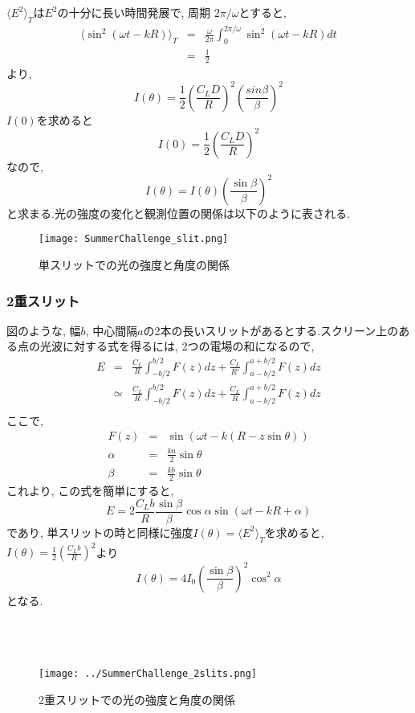 $\langle E^2\rangle_T$は$E^2$の十分に長い時間発展で, 周期 $2\pi / \omega$とすると, 
\begin{eqnarray*}
  \langle \sin^2(\omega t - kR)\rangle_T  &=& \frac{\omega}{2\pi} \int_{0}^{2\pi / \omega} \sin^2(\omega t - kR) dt \\
  &=& \frac{1}{2}
\end{eqnarray*}
より, 
\[
  I(\theta) = \frac{1}{2} \left(\frac{C_L D}{R}\right)^2 \left(\frac{sin \beta}{\beta}\right)^2
\]
$I(0)$を求めると
\[
  I(0) = \frac{1}{2} \left(\frac{C_L D}{R}\right)^2
\]
なので, 
\[
  I(\theta) = I(\theta) \left(\frac{\sin \beta}{\beta}\right)^2
\]
と求まる.光の強度の変化と観測位置の関係は以下のように表される.\\

\begin{figure}[h]
  \begin{center}
    \texttt{[image: SummerChallenge\_slit.png]}
    \caption{単スリットでの光の強度と角度の関係}
  \end{center}
\end{figure}

\clearpage

\subsubsection{2重スリット}
図のような, 幅$b$, 中心間隔$a$の2本の長いスリットがあるとする.スクリーン上のある点の光波に対する式を得るには, 2つの電場の和になるので, 
\begin{eqnarray*}
  E &=& \frac{C_L}{R} \int_{-b/2}^{b/2} F(z) dz + \frac{C_L}{R'} \int_{a-b/2}^{a+b/2} F(z) dz \\
  &\simeq& \frac{C_L}{R} \int_{-b/2}^{b/2} F(z) dz + \frac{C_L}{R} \int_{a-b/2}^{a+b/2} F(z) dz \\
\end{eqnarray*}
ここで, 
\begin{eqnarray*}
  F(z) &=& \sin(\omega t - k(R-z\sin\theta)) \\
  \alpha &=& \frac{ka}{2} \sin\theta \\
  \beta &=& \frac{kb}{2} \sin\theta
\end{eqnarray*}
これより, この式を簡単にすると, 
\[
  E = 2 \frac{C_L b}{R} \frac{\sin\beta}{\beta} \cos\alpha \sin(\omega t -kR + \alpha)
\]
であり, 単スリットの時と同様に強度$I(\theta) = \langle E^2\rangle_T$を求めると, $I(\theta) = \frac{1}{2} (\frac{C_L b}{R})^2$より
\[
  I(\theta) = 4I_0 \left(\frac{\sin \beta}{\beta}\right)^2 \cos^2 \alpha
\]
となる.\\
\\
\\
\\
\begin{figure}[h]
  \begin{center}
    \texttt{[image: ../SummerChallenge\_2slits.png]}
    \caption{2重スリットでの光の強度と角度の関係}
  \end{center}
\end{figure}

